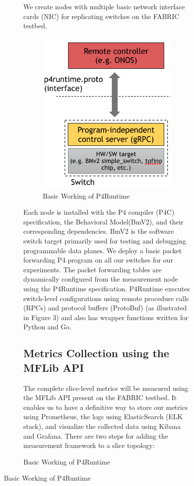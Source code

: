 \documentclass[conference]{IEEEtran}
\begin{document}
\begin{figure}[h!]
\begin{figure}[b]
     We create nodes with multiple basic network interface cards (NIC) for replicating switches on the FABRIC testbed.
    \begin{figure}[h!]
            \includegraphics[scale=0.2]{P4Runtime.png}
            \centering
            \caption{Basic Working of P4Runtime}
    \end{figure}
    Each node is installed with the P4 compiler (P4C) specification, the Behavioral Model(BmV2), and their corresponding dependencies. BmV2 is the software switch target primarily used for testing and debugging programmable data planes. We deploy a basic packet forwarding P4 program on all our switches for our experiments. The packet forwarding tables are dynamically configured from the measurement node using the P4Runtime specification. P4Runtime executes switch-level configurations using remote procedure calls (RPCs) and protocol buffers (ProtoBuf) (as illustrated in Figure 3) and also has wrapper functions written for Python and Go.


        \subsection{Metrics Collection using the MFLib API}
    The complete slice-level metrics will be measured using the MFLib API present on the FABRIC testbed. It enables us to have a definitive way to store our metrics using Prometheus, the logs using ElasticSearch (ELK stack), and visualize the collected data using Kibana and Grafana. There are two steps for adding the measurement framework to a slice topology:


\end{figure}
\end{figure}
\end{document}
